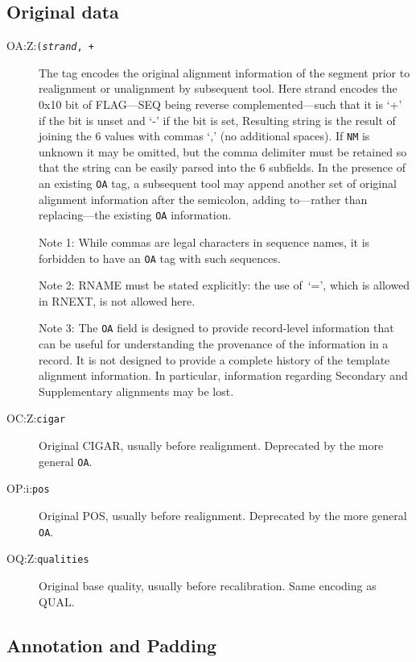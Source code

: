 \documentclass[10pt]{article}
\newcommand{\tagvalue}[1]{\tt #1}
\newcommand{\tagregex}[1]{\tt #1}
\begin{document}
\subsection{Original data}

\begin{description}
\item[OA:Z:\tagregex{{\tt (}\emph{strand}{\tt,\,}\sf{CIGAR}{\tt,\,}\sf{MAPQ}{\tt,\,}\sf{NM}{\tt; )}+}]
The tag encodes the original alignment information of the segment prior to realignment or unalignment by subsequent tool. 
Here {\sf strand} encodes the 0x10 bit of {\sf FLAG}---{\sf SEQ} being reverse complemented---such that it is `+' if the bit is unset and `-' if the bit is set,
Resulting string is the result of joining the 6 values with commas `,' (no additional spaces).
If  {\tt NM} is unknown it may be omitted, but the comma delimiter must be retained so that the string can be easily parsed into the 6 subfields.
In the presence of an existing {\tt OA} tag, a subsequent tool may append another set of original alignment information after the semicolon,
adding to---rather than replacing---the existing {\tt OA} information.

Note 1: While commas are legal characters in sequence names, it is forbidden to have an {\tt OA} tag with such sequences.

Note 2: {\sf RNAME} must be stated explicitly: the use of \,`=', which is allowed in {\sf RNEXT}, is not allowed here.

Note 3: The {\tt OA} field is designed to provide record-level information that can be useful for understanding the provenance of the information in a record. 
It is not designed to provide a complete history of the template alignment information. 
In particular, information regarding Secondary and Supplementary alignments may be lost.

\item[OC:Z:\tagvalue{cigar}]
Original CIGAR, usually before realignment.
Deprecated by the more general {\tt OA}.

\item[OP:i:\tagvalue{pos}]
Original {\sf POS}, usually before realignment.
Deprecated by the more general {\tt OA}.

\item[OQ:Z:\tagvalue{qualities}]
Original base quality, usually before recalibration.
Same encoding as {\sf QUAL}.
\end{description}

\subsection{Annotation and Padding}
\end{document}
